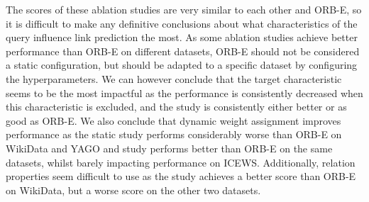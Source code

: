 The scores of these ablation studies are very similar to each other and ORB-E, so it is difficult to make any definitive conclusions about what characteristics of the query influence link prediction the most.
As some ablation studies achieve better performance than ORB-E on different datasets, ORB-E should not be considered a static configuration, but should be adapted to a specific dataset by configuring the hyperparameters.
We can however conclude that the target characteristic seems to be the most impactful as the performance is consistently decreased when this characteristic is excluded, and the study  is consistently either better or as good as ORB-E. 
We also conclude that dynamic weight assignment improves performance as the static  study performs considerably worse than ORB-E on WikiData and YAGO and  study performs better than ORB-E on the same datasets, whilst barely impacting performance on ICEWS.
Additionally, relation properties seem difficult to use as the study  achieves a better score than ORB-E on WikiData, but a worse score on the other two datasets.